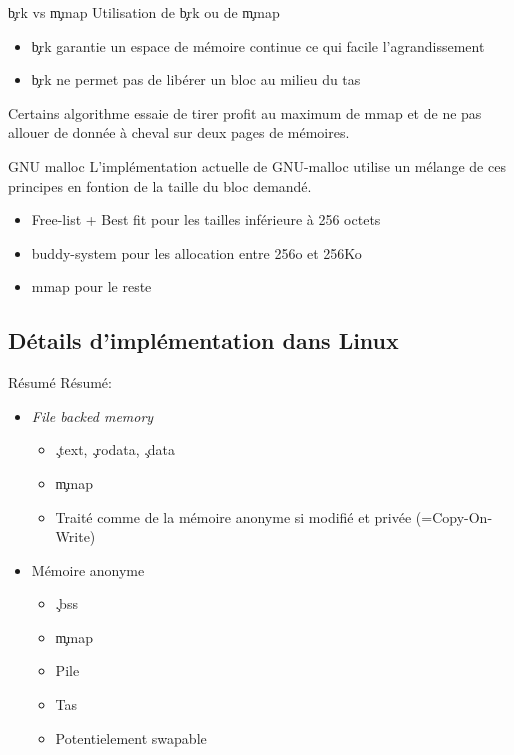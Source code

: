 \begin{frame}[fragile=singleslide]{\c{brk} vs \c{mmap}}
  Utilisation de \c{brk} ou de \c{mmap}
  \begin{itemize}
  \item \c{brk} garantie  un espace de mémoire continue  ce qui facile
    l'agrandissement
  \item \c{brk} ne permet pas de libérer un bloc au milieu du tas
  \end{itemize}
  Certains algorithme essaie de tirer  profit au maximum de mmap et de
  ne pas allouer de donnée à cheval sur deux pages de mémoires.
\end{frame}

\begin{frame}[fragile=singleslide]{GNU malloc}
  L'implémentation actuelle de  GNU-malloc utilise un mélange de
  ces principes en fontion de la taille du bloc demandé.
  \begin{itemize}
  \item Free-list + Best fit pour les tailles inférieure à 256 octets
  \item buddy-system pour les allocation entre 256o et 256Ko
  \item mmap pour le reste
  \end{itemize}
\end{frame}

\subsection{Détails d'implémentation dans Linux}

\begin{frame}[fragile=singleslide]{Résumé}
  Résumé:
  \begin{itemize}
  \item \emph{File backed memory}
    \begin{itemize}
    \item \c{.text}, \c{.rodata}, \c{.data}
    \item \c{mmap}
    \item Traité comme de la mémoire anonyme si modifié et privée (=Copy-On-Write)
    \end{itemize}
  \item Mémoire anonyme
    \begin{itemize}
    \item \c{.bss}
    \item \c{mmap}
    \item Pile
    \item Tas
    \item Potentielement swapable
    \end{itemize}
  \end{itemize}
\end{frame}

